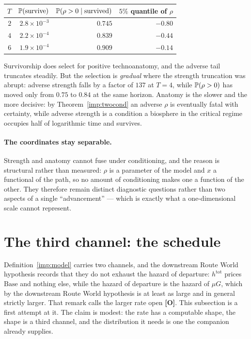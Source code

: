 \begin{center}\small
\begin{tabular}{@{}rrrr@{}}
\toprule
$T$ & $\mathbb{P}(\text{survive})$ & $\mathbb{P}(\rho>0\mid\text{survived})$ &
$5\%$ quantile of $\rho$\\
\midrule
$2$ & $2.8\times10^{-3}$ & $0.745$ & $-0.80$\\
$4$ & $2.2\times10^{-4}$ & $0.839$ & $-0.44$\\
$6$ & $1.9\times10^{-4}$ & $0.909$ & $-0.14$\\
\bottomrule
\end{tabular}
\end{center}

\noindent Survivorship does select for positive technoanatomy, and the
adverse tail truncates steadily. But the selection is \emph{gradual}
where the strength truncation was abrupt: adverse strength falls by a
factor of $137$ at $T=4$, while $\mathbb{P}(\rho>0)$ has moved only from
$0.75$ to $0.84$ at the same horizon. Anatomy is the slower and the more
decisive: by Theorem~\ref{imp:twocond} an adverse $\rho$ is
eventually fatal with certainty, while adverse strength is a condition
a biosphere in the critical regime occupies half of logarithmic time and
survives.

\paragraph{The coordinates stay separable.}\label{gr:rem:separable}
Strength and anatomy cannot fuse under conditioning, and the reason is
structural rather than measured: $\rho$ is a parameter of the model and
$x$ a functional of the path, so no amount of conditioning makes one a
function of the other. They therefore remain distinct diagnostic
questions rather than two aspects of a single ``advancement'' --- which
is exactly what a one-dimensional scale cannot represent.



\section{The third channel: the schedule}\label{sec:schedule}


Definition~\ref{imp:model} carries two channels, and
the downstream Route World hypothesis records that they do not exhaust the
hazard of departure: $h^{\mathrm{tot}}$ prices $\mathrm{Base}$ and
nothing else, while the hazard of departure is the hazard of $\mu G$,
which by the downstream Route World hypothesis is at least as large and in general
strictly larger. That remark calls the larger rate open \textbf{[O]}. This subsection is a first attempt at it. The claim is modest: the rate
has a computable shape, the shape is a third channel, and the
distribution it needs is one the companion already supplies.

